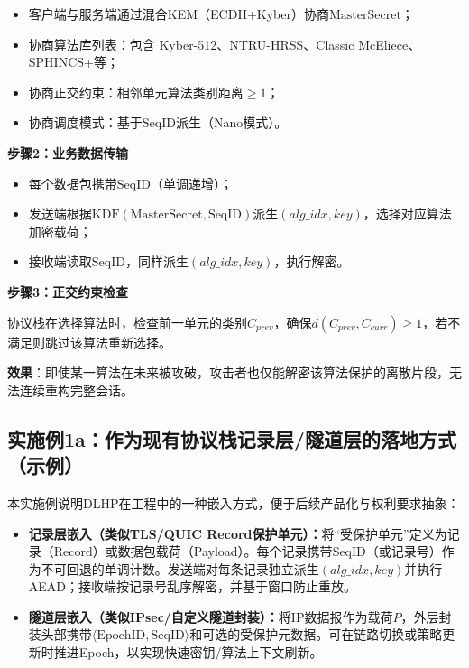\documentclass[12pt,a4paper]{article}
\begin{document}
\begin{itemize}
    \item 客户端与服务端通过混合KEM（ECDH+Kyber）协商$\text{MasterSecret}$；
    \item 协商算法库列表：包含 Kyber-512、NTRU-HRSS、Classic McEliece、SPHINCS+等；
    \item 协商正交约束：相邻单元算法类别距离$\geq 1$；
    \item 协商调度模式：基于$\text{SeqID}$派生（Nano模式）。
\end{itemize}

\textbf{步骤2：业务数据传输}

\begin{itemize}
    \item 每个数据包携带$\text{SeqID}$（单调递增）；
    \item 发送端根据$\text{KDF}(\text{MasterSecret}, \text{SeqID})$派生$(alg\_idx, key)$，选择对应算法加密载荷；
    \item 接收端读取$\text{SeqID}$，同样派生$(alg\_idx, key)$，执行解密。
\end{itemize}

\textbf{步骤3：正交约束检查}

协议栈在选择算法时，检查前一单元的类别$C_{prev}$，确保$d(C_{prev}, C_{curr}) \geq 1$，若不满足则跳过该算法重新选择。

\textbf{效果}：即使某一算法在未来被攻破，攻击者也仅能解密该算法保护的离散片段，无法连续重构完整会话。

\subsection{实施例1a：作为现有协议栈记录层/隧道层的落地方式（示例）}

本实施例说明DLHP在工程中的一种嵌入方式，便于后续产品化与权利要求抽象：

\begin{itemize}
    \item \textbf{记录层嵌入（类似TLS/QUIC Record保护单元）：}将“受保护单元”定义为记录（Record）或数据包载荷（Payload）。每个记录携带$\text{SeqID}$（或记录号）作为不可回退的单调计数。发送端对每条记录独立派生$(alg\_idx, key)$并执行AEAD；接收端按记录号乱序解密，并基于窗口防止重放。
    \item \textbf{隧道层嵌入（类似IPsec/自定义隧道封装）：}将IP数据报作为载荷$P$，外层封装头部携带$\langle\text{EpochID},\text{SeqID}\rangle$和可选的受保护元数据。可在链路切换或策略更新时推进Epoch，以实现快速密钥/算法上下文刷新。
\end{itemize}
\end{document}
